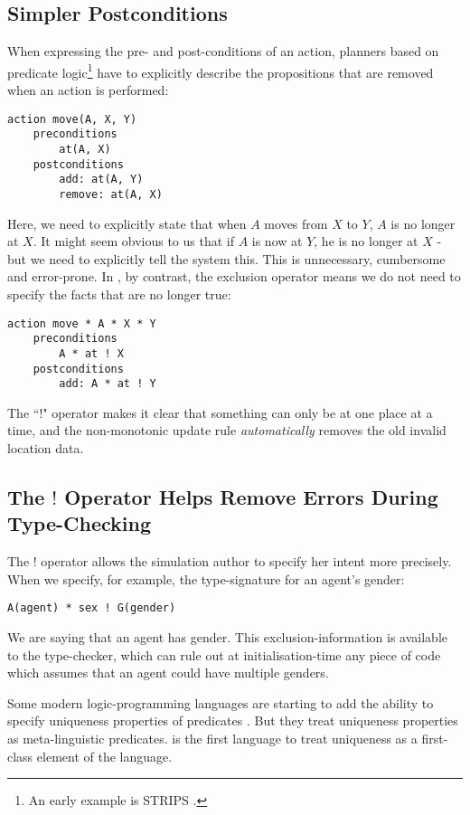 \subsection{Simpler Postconditions}
When expressing the pre- and post-conditions of an action, planners based on predicate logic\footnote{An early example is STRIPS \cite{strips}.} have to explicitly describe the propositions that are removed when an action is performed:
\begin{verbatim}
action move(A, X, Y)
    preconditions
        at(A, X)
    postconditions
        add: at(A, Y) 
        remove: at(A, X)
\end{verbatim}
Here, we need to explicitly state that when $A$ moves from $X$ to $Y$, $A$ is no longer at $X$. It might seem obvious to us that if $A$ is now at $Y$, he is no longer at $X$ - but we need to explicitly tell the system this. This is unnecessary, cumbersome and error-prone. In \ELFULL{}, by contrast, the exclusion operator means we do not need to specify the facts that are no longer true:
\begin{verbatim}
action move * A * X * Y
    preconditions
        A * at ! X
    postconditions
        add: A * at ! Y
\end{verbatim}
The ``!" operator makes it clear that something can only be at one place at a time, and the non-monotonic update rule \emph{automatically} removes the old invalid location data.

\subsection{The $!$ Operator Helps Remove Errors During Type-Checking}
The $!$ operator allows the simulation author to specify her intent more precisely.
When we specify, for example, the type-signature for an agent's gender:
\begin{verbatim}
A(agent) * sex ! G(gender)
\end{verbatim}
We are saying that an agent has  gender.
This exclusion-information is available to the type-checker, which can rule out at initialisation-time any piece of code which assumes that an agent could have multiple genders. 

Some modern logic-programming languages are starting to add the ability to specify uniqueness properties of predicates \cite{mercury}. 
But they treat uniqueness properties as meta-linguistic predicates. 
\ELFULL{} is the first language to treat uniqueness as a first-class element of the language.


